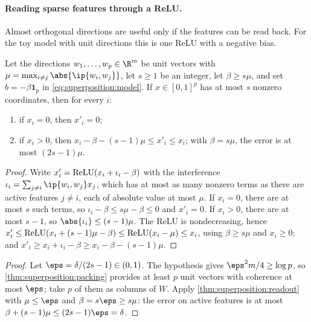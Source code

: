\begin{refsection}
\paragraph{Reading sparse features through a ReLU.} Almost orthogonal directions are useful only if the features can be read back. For the toy model with unit directions this is one ReLU with a negative bias.

\begin{theorem}\label{thm:superposition:readout}
Let the directions $w_1,\dots,w_p\in\R^m$ be unit vectors with  $\mu=\max_{i\ne j}\abs{\ip{w_i,w_j}}$, let $s\ge1$ be an integer, let $\beta\ge s\mu$, and set $b=-\beta\mathbf 1_p$ in \eqref{eq:superposition:model}. If $x\in[0,1]^p$ has at most $s$ nonzero coordinates, then for every $i$:
\begin{enumerate}
\item if $x_i=0$, then $x'_i=0$;
\item if $x_i>0$, then $x_i-\beta-(s-1)\mu\le x'_i\le x_i$; with $\beta=s\mu$, the error is at most $(2s-1)\mu$.
\end{enumerate}
\end{theorem}

\begin{proof}
Write $x'_i=\operatorname{ReLU}(x_i+\iota_i-\beta)$ with the interference $\iota_i=\sum_{j\ne i}\ip{w_i,w_j}x_j$, which has at most as many nonzero terms as there are active features $j\ne i$, each of absolute value at most $\mu$. If $x_i=0$, there are at most $s$ such terms, so $\iota_i-\beta\le s\mu-\beta\le0$ and $x'_i=0$. If $x_i>0$, there are at most $s-1$, so $\abs{\iota_i}\le(s-1)\mu$. The ReLU is nondecreasing, hence $x'_i\le\operatorname{ReLU}(x_i+(s-1)\mu-\beta)\le\operatorname{ReLU}(x_i-\mu)\le x_i$, using $\beta\ge s\mu$ and $x_i\ge0$; and $x'_i\ge x_i+\iota_i-\beta\ge x_i-\beta-(s-1)\mu$.
\end{proof}


\begin{proof}
Let $\eps=\delta/(2s-1)\in(0,1)$. The hypothesis gives $\eps^2m/4\ge\log p$, so \cref{thm:superposition:packing} provides at least $p$ unit vectors with coherence at most $\eps$; take $p$ of them as columns of $W$. Apply \cref{thm:superposition:readout} with $\mu\le\eps$ and $\beta=s\eps\ge s\mu$: the error on active features is at most $\beta+(s-1)\mu\le(2s-1)\eps=\delta$.
\end{proof}


\end{refsection}
